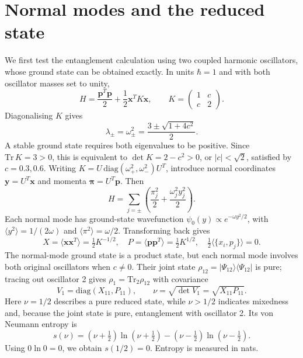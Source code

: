 \documentclass[11pt,a4paper]{article}
\begin{document}
\section{Normal modes and the reduced state}
We first test the entanglement calculation using two coupled harmonic oscillators, whose ground state can be obtained exactly. In units $\hbar=1$ and with both oscillator masses set to unity,
\begin{equation}
H=\frac{\bm p^T\bm p}{2}+\frac12\bm x^TK\bm x,\qquad
K=\begin{pmatrix}1&c\\c&2\end{pmatrix}.
\end{equation}
Diagonalising $K$ gives
\begin{equation}
\lambda_\pm=\omega_\pm^2=\frac{3\pm\sqrt{1+4c^2}}{2}.
\end{equation}
A stable ground state requires both eigenvalues to be positive. Since $\mathrm{Tr}\,K=3>0$, this is equivalent to $\det K=2-c^2>0$, or $|c|<\sqrt2$, satisfied by $c=0.3,0.6$.
Writing $K=U\,\mathrm{diag}(\omega_+^2,\omega_-^2)U^T$, introduce normal coordinates $\bm y=U^T\bm x$ and momenta $\bm\pi=U^T\bm p$. Then
\begin{equation}
H=\sum_{j=\pm}\left(\frac{\pi_j^2}{2}+\frac{\omega_j^2y_j^2}{2}\right).
\end{equation}
Each normal mode has ground-state wavefunction $\psi_0(y)\propto e^{-\omega y^2/2}$, with $\langle y^2\rangle=1/(2\omega)$ and $\langle\pi^2\rangle=\omega/2$. Transforming back gives
\begin{equation}
X=\langle\bm x\bm x^T\rangle=\tfrac12K^{-1/2},\quad
P=\langle\bm p\bm p^T\rangle=\tfrac12K^{1/2},\quad
\tfrac12\langle\{x_i,p_j\}\rangle=0.
\end{equation}
The normal-mode ground state is a product state, but each normal mode involves both original oscillators when $c\ne0$. Their joint state $\rho_{12}=|\Psi_{12}\rangle\langle\Psi_{12}|$ is pure; tracing out oscillator 2 gives $\rho_1=\mathrm{Tr}_2\rho_{12}$ with covariance
\begin{equation}
V_1=\mathrm{diag}(X_{11},P_{11}),\qquad \nu=\sqrt{\det V_1}=\sqrt{X_{11}P_{11}}.
\end{equation}
Here $\nu=1/2$ describes a pure reduced state, while $\nu>1/2$ indicates mixedness and, because the joint state is pure, entanglement with oscillator 2. Its von Neumann entropy is
\begin{equation}
\boxed{s(\nu)=(\nu+\tfrac12)\ln(\nu+\tfrac12)-(\nu-\tfrac12)\ln(\nu-\tfrac12).}
\end{equation}
Using $0\ln0=0$, we obtain $s(1/2)=0$. Entropy is measured in nats.
\end{document}
